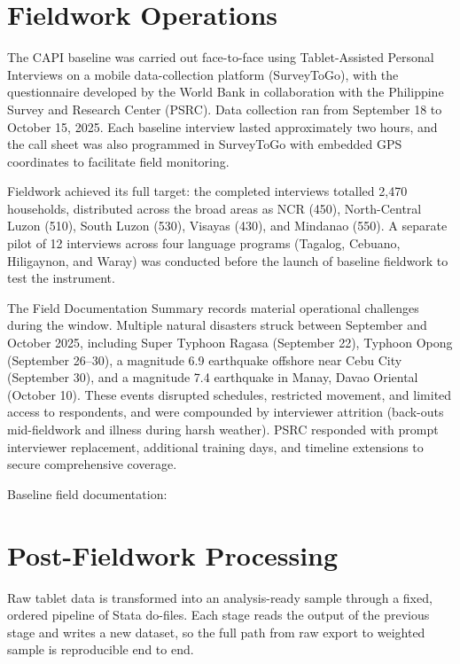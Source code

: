 
\section{Fieldwork Operations}

The CAPI baseline was carried out face-to-face using Tablet-Assisted Personal
Interviews on a mobile data-collection platform (SurveyToGo), with the
questionnaire developed by the World Bank in collaboration with the Philippine
Survey and Research Center (PSRC). Data collection ran from September 18 to
October 15, 2025. Each baseline interview lasted approximately two hours, and
the call sheet was also programmed in SurveyToGo with embedded GPS coordinates
to facilitate field monitoring.

Fieldwork achieved its full target: the completed interviews totalled 2,470
households, distributed across the broad areas as NCR (450), North-Central Luzon
(510), South Luzon (530), Visayas (430), and Mindanao (550). A separate pilot
of 12 interviews across four language programs (Tagalog, Cebuano, Hiligaynon,
and Waray) was conducted before the launch of baseline fieldwork to test the
instrument.

The Field Documentation Summary records material operational challenges during
the window. Multiple natural disasters struck between September and October
2025, including Super Typhoon Ragasa (September 22), Typhoon Opong (September
26--30), a magnitude 6.9 earthquake offshore near Cebu City (September 30), and
a magnitude 7.4 earthquake in Manay, Davao Oriental (October 10). These events
disrupted schedules, restricted movement, and limited access to respondents, and
were compounded by interviewer attrition (back-outs mid-fieldwork and illness
during harsh weather). PSRC responded with prompt interviewer replacement,
additional training days, and timeline extensions to secure comprehensive
coverage.

\begin{refbox}
Baseline field documentation:\\
\end{refbox}

\section{Post-Fieldwork Processing}

Raw tablet data is transformed into an analysis-ready sample through a fixed,
ordered pipeline of Stata do-files. Each stage reads the output of the previous
stage and writes a new dataset, so the full path from raw export to weighted
sample is reproducible end to end.

